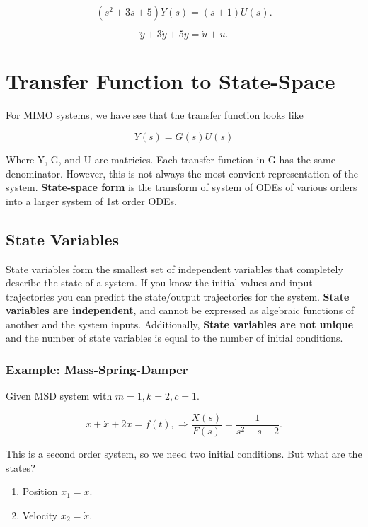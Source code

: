 \documentclass[12pt, a4paper]{report}
\begin{document}
  \[
      (s ^2 + 3s + 5) Y(s) = (s + 1) U(s)
    .\]

  \[
      \ddot y + 3 \dot y + 5y = \dot u + u
    .\]

  \section{Transfer Function to State-Space}

  For MIMO systems, we have see that the transfer function looks like

  \begin{equation}
    Y(s) = G(s)U(s)
  \end{equation}

  Where Y, G, and U are matricies. Each transfer function in G has the same denominator. However, this is not always the most convient representation of the system. \textbf{State-space form} is the transform of system of ODEs of various orders into a larger system of 1st order ODEs.

  \subsection{State Variables}

  State variables form the smallest set of independent variables that completely describe the state of a system. If you know the initial values and input trajectories you can predict the state/output trajectories for the system. \textbf{State variables are independent}, and cannot be expressed as algebraic functions of another and the system inputs. Additionally, \textbf{State variables are not unique} and the number of state variables is equal to the number of initial conditions.

  \subsubsection{Example: Mass-Spring-Damper}

  Given MSD system with $ m = 1, k = 2, c = 1. $

  \[
      \ddot x + \dot x + 2x = f(t), \Rightarrow \frac{X(s)}{F(s)} = \frac{1}{s ^2 + s + 2}
    .\]

  This is a second order system, so we need two initial conditions. But what are the states?

  \begin{enumerate}
    \item Position $ x_1 = x. $
    \item Velocity $ x_2 = \dot x. $
  \end{enumerate}
\end{document}
